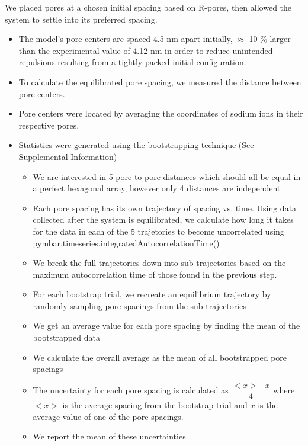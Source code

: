 \documentclass{article}
\begin{document}
  We placed pores at a chosen initial spacing based on R-pores, then allowed
  the system to settle into its preferred spacing. 
  \begin{itemize}
    \item The model's pore centers are spaced 4.5 nm apart initially, $\approx$ 10 \% larger
    than the experimental value of 4.12 nm in order to reduce unintended repulsions 
    resulting from a tightly packed initial configuration.
    \item To calculate the equilibrated pore spacing, we measured the distance between pore
    centers.
    \item Pore centers were located by averaging the coordinates of sodium ions in their 
    respective pores.
    \item Statistics were generated using the bootstrapping technique (See Supplemental Information)
	\begin{itemize}
        \item We are interested in 5 pore-to-pore distances which should all be equal in
        a perfect hexagonal array, however only 4 distances are independent %
	\item Each pore spacing has its own trajectory of spacing vs. time. Using data collected after
	the system is equilibrated, we calculate how long it takes for the data in each of the 5
	trajetories to become uncorrelated using pymbar.timeseries.integratedAutocorrelationTime() %
	\item We break the full trajectories down into sub-trajectories based on the
	maximum autocorrelation time of those found in the previous step. 
    	\item For each bootstrap trial, we recreate an equilibrium trajectory by randomly 
    	sampling pore spacings from the sub-trajectories 
    	\item We get an average value for each pore spacing by finding the mean of the bootstrapped data
	\item We calculate the overall average as the mean of all bootstrapped pore spacings
	\item The uncertainty for each pore spacing is calculated as $\dfrac{<x> - x}{4}$ where $<x>$ is the
	average spacing from the bootstrap trial and $x$ is the average value of one of the pore spacings.
	\item We report the mean of these uncertainties
	\end{itemize}
  \end{itemize}
  
\end{document}
